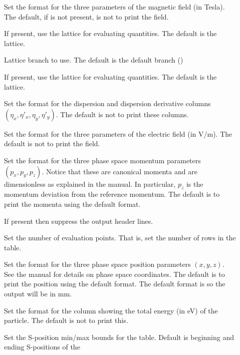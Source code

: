 {{{{{{{{{{\begin{description}
\item[] \Newline
Set the format for the three parameters of the magnetic field (in Tesla). The default, if
 is not present, is not to print the field.
%
\item[] \Newline
If present, use the  lattice for evaluating quantities. The default is the 
lattice.
%
\item[] \Newline
Lattice branch to use. The default is the default branch ()
%
\item[] \Newline
If present, use the  lattice for evaluating quantities. The default is the 
lattice.
%
\item[] \Newline
Set the format for the dispersion and dispersion derivative columns $(\eta_x, \eta'_x, \eta_y, \eta'_y)$. 
The default is not to print these columns.
%
\item[] \Newline
Set the format for the three parameters of the electric field (in V/m). The default is not to print
the field.
%
\item[] \Newline
Set the format for the three phase space momentum parameters $(p_x, p_y, p_z)$. Notice that these
are canonical momenta and are dimensionless as explained in the \bmad manual. In particular, $p_z$
is the momentum deviation from the reference momentum. The default is to print the momenta using the
default format.
%
\item[] \Newline
If present then suppress the output header lines.
%
\item[] \Newline
Set the number of evaluation points. That is, set the number of rows in the table.
%
\item[] \Newline
Set the format for the three phase space position parameters $(x, y, z)$. See the \bmad manual for 
details on phase space coordinates. The default is to print the position using the default format.
The default format is  so the output will be in mm.
%
\item[] \Newline
Set the format for the column showing the total energy (in eV) of the particle. The default is not
to print this.
%
\item[] \Newline
Set the S-position min/max bounds for the table. Default is beginning and ending S-positions of the

\end{description}}}}}}}}}}}
